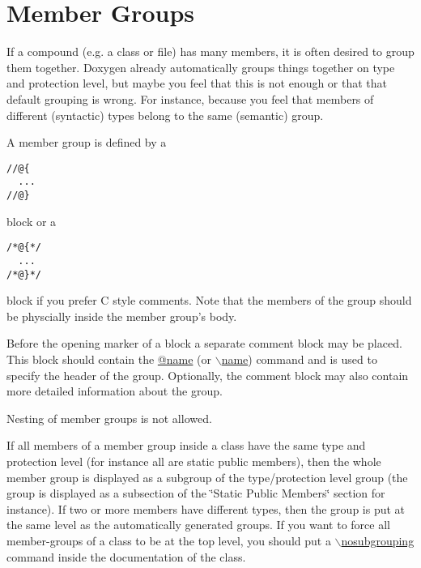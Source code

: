 \hypertarget{grouping_memgroup}{}\section{Member Groups}\label{grouping_memgroup}
If a compound (e.g. a class or file) has many members, it is often desired to group them together. Doxygen already automatically groups things together on type and protection level, but maybe you feel that this is not enough or that that default grouping is wrong. For instance, because you feel that members of different (syntactic) types belong to the same (semantic) group.

A member group is defined by a 

\footnotesize\begin{verbatim}
//@{ 
  ...
//@}
\end{verbatim}
\normalsize
 block or a 

\footnotesize\begin{verbatim}
/*@{*/ 
  ... 
/*@}*/ 
\end{verbatim}
\normalsize
 block if you prefer C style comments. Note that the members of the group should be physcially inside the member group's body.

Before the opening marker of a block a separate comment block may be placed. This block should contain the \hyperlink{commands_cmdname}{@name} (or \hyperlink{commands_cmdname}{$\backslash$name}) command and is used to specify the header of the group. Optionally, the comment block may also contain more detailed information about the group.

Nesting of member groups is not allowed.

If all members of a member group inside a class have the same type and protection level (for instance all are static public members), then the whole member group is displayed as a subgroup of the type/protection level group (the group is displayed as a subsection of the \char`\"{}Static Public Members\char`\"{} section for instance). If two or more members have different types, then the group is put at the same level as the automatically generated groups. If you want to force all member-groups of a class to be at the top level, you should put a \hyperlink{commands_cmdnosubgrouping}{$\backslash$nosubgrouping} command inside the documentation of the class.

